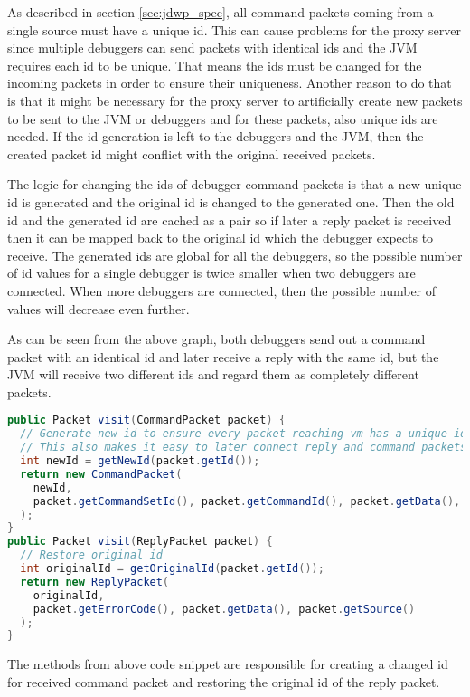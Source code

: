 \documentclass[..thesis.tex]{subfiles}
\begin{document}
As described in section \ref{sec:jdwp_spec}, all command packets coming from a single source must have a unique id.
This can cause problems for the proxy server since multiple debuggers can send packets with identical ids and the JVM requires each id to be unique.
That means the ids must be changed for the incoming packets in order to ensure their uniqueness.
Another reason to do that is that it might be necessary for the proxy server to artificially create new packets to be sent to the JVM or debuggers and for these packets, also unique ids are needed.
If the id generation is left to the debuggers and the JVM, then the created packet id might conflict with the original received packets.

The logic for changing the ids of debugger command packets is that a new unique id is generated and the original id is changed to the generated one.
Then the old id and the generated id are cached as a pair so if later a reply packet is received then it can be mapped back to the original id which the debugger expects to receive.
The generated ids are global for all the debuggers, so the possible number of id values for a single debugger is twice smaller when two debuggers are connected.
When more debuggers are connected, then the possible number of values will decrease even further.



As can be seen from the above graph, both debuggers send out a command packet with an identical id and later receive a reply with the same id, but the JVM will receive two different ids and regard them as completely different packets.

\begin{lstlisting}[language=java]
public Packet visit(CommandPacket packet) {
  // Generate new id to ensure every packet reaching vm has a unique id
  // This also makes it easy to later connect reply and command packets and avoid collision
  int newId = getNewId(packet.getId());
  return new CommandPacket(
    newId,
    packet.getCommandSetId(), packet.getCommandId(), packet.getData(), packet.getSource()
  );
}
public Packet visit(ReplyPacket packet) {
  // Restore original id
  int originalId = getOriginalId(packet.getId());
  return new ReplyPacket(
    originalId,
    packet.getErrorCode(), packet.getData(), packet.getSource()
  );
}
\end{lstlisting}

The  methods from above code snippet are responsible for creating a changed id for received command packet and restoring the original id of the reply packet.
\end{document}
